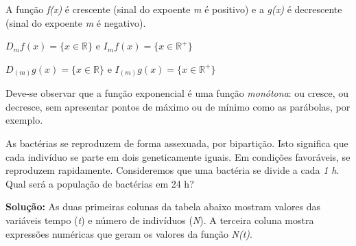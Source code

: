 \begin{texemplo}
	\item A função \textit{f(x)} é crescente (sinal do expoente \textit{m} é positivo) e a \textit{g(x)} é decrescente (sinal do expoente \textit{m} é negativo). 

	\item $D_{m} f(x) = \{ x  \in \mathbb{R} \}$ e $I_{m} f(x) = \{x \in \mathbb{R}^{+} \}$

 	\item $D_(m) g(x) = \{ x \in \mathbb{R} \}$ e $I_(m) g(x) = \{x \in \mathbb{R}^{+} \}$

Deve-se observar que a função exponencial é uma função \textit{monótona}: ou cresce, ou decresce, sem apresentar pontos de máximo ou de mínimo como as parábolas, por exemplo. \qedsymbol{}
\end{texemplo}

\begin{texemplo}
As bactérias se reproduzem de forma assexuada, por bipartição. Isto significa que cada indivíduo se parte em dois geneticamente iguais. Em condições favoráveis, se reproduzem rapidamente. Consideremos que uma bactéria se divide a cada \textit{1 h}. Qual será a população de bactérias em 24 h?

\textbf{Solução:} As duas primeiras colunas da tabela abaixo mostram valores das variáveis tempo (\textit{t}) e número de indivíduos (\textit{N}). A terceira coluna mostra expressões numéricas que geram os valores da função \textit{N(t)}.


\end{texemplo}
